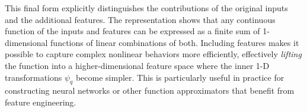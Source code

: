 \documentclass{article}
\begin{document}
{    This final form explicitly distinguishes the contributions of the original inputs and the additional features. The representation shows that any continuous function of the inputs and features can be expressed as a finite sum of 1-dimensional functions of linear combinations of both. Including features makes it possible to capture complex nonlinear behaviors more efficiently, effectively \textit{lifting} the function into a higher-dimensional feature space where the inner 1-D transformations \(\psi_q\) become simpler. This is particularly useful in practice for constructing neural networks or other function approximators that benefit from feature engineering.
}

\end{document}
